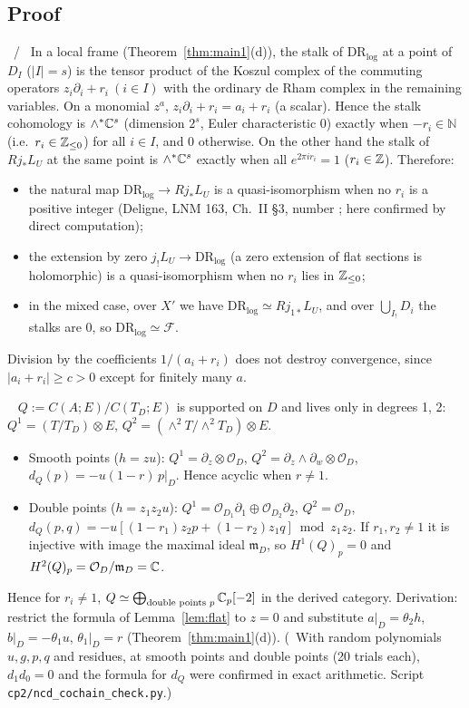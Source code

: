 \subsection{Proof}
\begin{lem}\tP\ /\ \tC\label{lem:stalk}
In a local frame (Theorem~\ref{thm:main1}(d)), the stalk of $\mathrm{DR}_{\log}$ at a point of $D_I$ ($|I|=s$) is the tensor product of the Koszul complex of the commuting operators $z_i\partial_i+r_i\ (i\in I)$ with the ordinary de Rham complex in the remaining variables. On a monomial $z^a$, $z_i\partial_i+r_i=a_i+r_i$ (a scalar). Hence the stalk cohomology is $\wedge^*\mathbb C^s$ (dimension $2^s$, Euler characteristic 0) exactly when $-r_i\in\mathbb N$ (i.e.\ $r_i\in\mathbb Z_{\le0}$) for all $i\in I$, and $0$ otherwise. On the other hand the stalk of $Rj_*L_U$ at the same point is $\wedge^*\mathbb C^s$ exactly when all $e^{2\pi ir_i}=1$ ($r_i\in\mathbb Z$). Therefore:
\begin{itemize}
\item the natural map $\mathrm{DR}_{\log}\to Rj_*L_U$ is a quasi-isomorphism when no $r_i$ is a positive integer (Deligne, LNM 163, Ch.~II \S3, number \tQ; here confirmed by direct computation);
\item the extension by zero $j_!L_U\to\mathrm{DR}_{\log}$ (a zero extension of flat sections is holomorphic) is a quasi-isomorphism when no $r_i$ lies in $\mathbb Z_{\le0}$;
\item in the mixed case, over $X'$ we have $\mathrm{DR}_{\log}\simeq Rj_{1*}L_U$, and over $\bigcup_{I_!}D_i$ the stalks are $0$, so $\mathrm{DR}_{\log}\simeq\mathcal F$.
\end{itemize}
Division by the coefficients $1/(a_i+r_i)$ does not destroy convergence, since $|a_i+r_i|\ge c>0$ except for finitely many $a$.
\end{lem}
\begin{lem}\tP\ \tV\label{lem:Q}
$Q:=C(A;E)/C(T_D;E)$ is supported on $D$ and lives only in degrees 1, 2: $Q^1=(T/T_D)\otimes E$, $Q^2=(\wedge^2T/\wedge^2T_D)\otimes E$.
\begin{itemize}
\item Smooth points ($h=zu$): $Q^1=\partial_z\otimes\mathcal O_D$, $Q^2=\partial_z\wedge\partial_w\otimes\mathcal O_D$, $d_Q(p)=-u(1-r)\,p|_D$. Hence acyclic when $r\ne1$.
\item Double points ($h=z_1z_2u$): $Q^1=\mathcal O_{D_1}\partial_1\oplus\mathcal O_{D_2}\partial_2$, $Q^2=\mathcal O_D$, $d_Q(p,q)=-u[(1-r_1)z_2p+(1-r_2)z_1q]\bmod z_1z_2$. If $r_1,r_2\ne1$ it is injective with image the maximal ideal $\mathfrak m_D$, so $H^1(Q)_p=0$ and $H^2(Q)_p=\mathcal O_D/\mathfrak m_D=\mathbb C$.
\end{itemize}
Hence for $r_i\ne1$, $Q\simeq\bigoplus_{\text{double points }p}\mathbb C_p[-2]$ in the derived category.
Derivation: restrict the formula of Lemma~\ref{lem:flat} to $z=0$ and substitute $a|_D=\theta_2h$, $b|_D=-\theta_1u$, $\theta_1|_D=r$ (Theorem~\ref{thm:main1}(d)). (\tV\ With random polynomials $u,g,p,q$ and residues, at smooth points and double points (20 trials each), $d_1d_0=0$ and the formula for $d_Q$ were confirmed in exact arithmetic. Script \texttt{cp2/ncd\_cochain\_check.py}.)
\end{lem}
